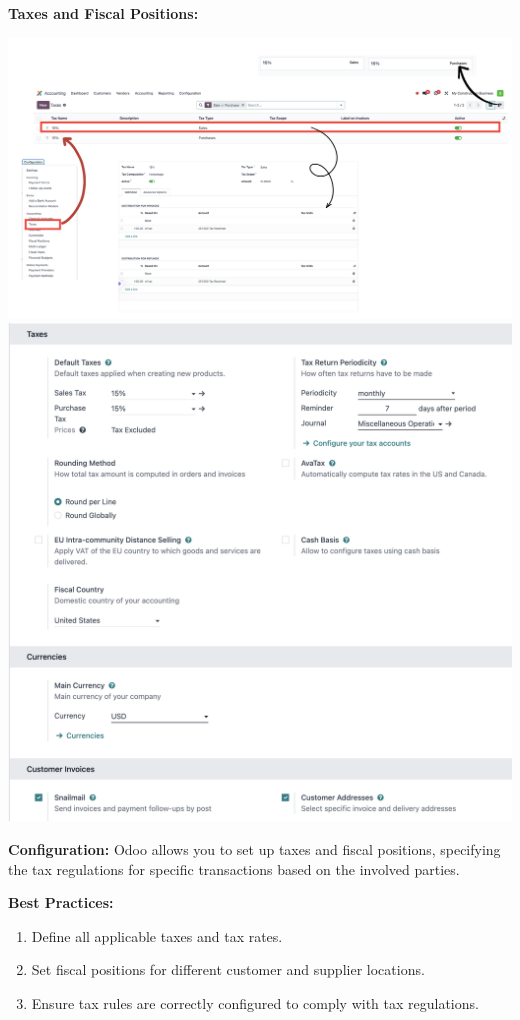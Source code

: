 \documentclass[11pt,a4paper]{article}
\begin{document}
\newpage
\noindent\textbf{Taxes and Fiscal Positions:}
\begin{center}
    \includegraphics[width=0.8\linewidth]{diagram/Taxes.png}
    \includegraphics[width=0.8\linewidth]{diagram/Taxes_second.png}
\end{center}

\noindent\textbf{Configuration:} Odoo allows you to set up taxes and fiscal positions, specifying the tax regulations for 
specific transactions based on the involved parties.
\medskip

\noindent\textbf{Best Practices:}
\begin{enumerate}
    \item Define all applicable taxes and tax rates.
    \item Set fiscal positions for different customer and supplier locations.
    \item Ensure tax rules are correctly configured to comply with tax regulations.
\end{enumerate}
\end{document}
